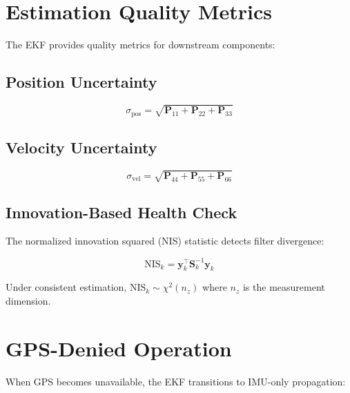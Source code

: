 \section{Estimation Quality Metrics}

The EKF provides quality metrics for downstream components:

\subsection{Position Uncertainty}

\begin{equation}
    \sigma_{\text{pos}} = \sqrt{\mathbf{P}_{11} + \mathbf{P}_{22} + \mathbf{P}_{33}}
\end{equation}

\subsection{Velocity Uncertainty}

\begin{equation}
    \sigma_{\text{vel}} = \sqrt{\mathbf{P}_{44} + \mathbf{P}_{55} + \mathbf{P}_{66}}
\end{equation}

\subsection{Innovation-Based Health Check}

The normalized innovation squared (NIS) statistic detects filter divergence:

\begin{equation}
    \text{NIS}_k = \mathbf{y}_k^\top \mathbf{S}_k^{-1} \mathbf{y}_k
\end{equation}

Under consistent estimation, $\text{NIS}_k \sim \chi^2(n_z)$ where $n_z$ is the measurement dimension.


\section{GPS-Denied Operation}

When GPS becomes unavailable, the EKF transitions to IMU-only propagation:


